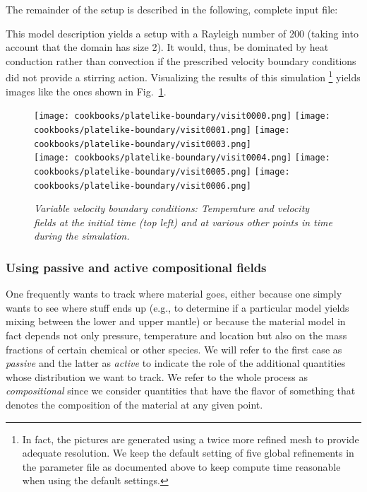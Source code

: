 \documentclass{article}
\begin{document}
The remainder of the setup is described in the following, complete input file:



This model description yields a setup with a Rayleigh number of 200 (taking
into account that the domain has size 2). It would, thus, be dominated by heat
conduction rather than convection if the prescribed velocity boundary conditions
did not provide a stirring action. Visualizing the results of this simulation%
\footnote{In fact, the pictures are generated using a twice more refined mesh
to provide adequate resolution. We keep the default setting of five
global refinements in the parameter file as documented above to keep compute
time reasonable when using the default settings.}
yields images like the ones shown in Fig.~\ref{fig:platelike}.

\begin{figure}
  \centering
  \texttt{[image: cookbooks/platelike-boundary/visit0000.png]}
  \hfill
  \texttt{[image: cookbooks/platelike-boundary/visit0001.png]}
  \hfill
  \texttt{[image: cookbooks/platelike-boundary/visit0003.png]}
  \\
  \texttt{[image: cookbooks/platelike-boundary/visit0004.png]}
  \hfill
  \texttt{[image: cookbooks/platelike-boundary/visit0005.png]}
  \hfill
  \texttt{[image: cookbooks/platelike-boundary/visit0006.png]}
  \caption{\it Variable velocity boundary conditions: Temperature and velocity
  fields at the initial time (top left) and at various other points in time during the
  simulation.}
  \label{fig:platelike}
\end{figure}


\subsubsection{Using passive and active compositional fields}
\label{sec:cookbooks-composition}

One frequently wants to track where material goes, either because one simply
wants to see where stuff ends up (e.g., to determine if a particular model
yields mixing between the lower and upper mantle) or because the material model
in fact depends not only pressure, temperature and location but also on the
mass fractions of certain chemical or other species. We will refer to the first
case as \textit{passive} and the latter as \textit{active} to indicate the role
of the additional quantities whose distribution we want to track. We refer to
the whole process as \textit{compositional} since we consider quantities that
have the flavor of something that denotes the composition of the material at any
given point.
\end{document}
